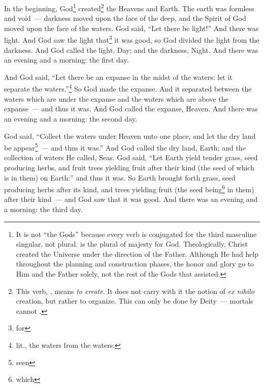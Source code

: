 
\begin{inparaenum}
     In the beginning, God\footnote{It is not ``the Gods'' because every verb is conjugated for the third masculine singular, not plural.  is the plural of majesty for God. Theologically, Christ created the Universe under the direction of the Father. Although He had help throughout the planning and construction phases, the honor and glory go to Him and the Father solely, not the rest of the Gods that assisted.} created\footnote{This verb, , means \textit{to create}. It does not carry with it the notion of \textit{ex nihilo} creation, but rather to organize. This can only be done by Deity~--- mortals cannot .} the Heavens and Earth.%
     The earth was formless and void~--- darkness moved upon the face of the deep, and the Spirit of God moved upon the face of the waters.%
     God said, ``Let there be light!'' And there was light.%
     And God saw the light that\footnote{for} it was good, so God divided the light from the darkness.%
     And God called the light, Day; and the darkness, Night. And there was an evening and a morning: the first day.%
    
     And God said, ``Let there be an expanse in the midst of the waters: let it separate the waters.''\footnote{lit., the waters from the waters.}%
     So God made the expanse. And it separated between the waters which are under the expanse and the waters which are above the expanse~--- and thus it was.%
     And God called the expanse, Heaven. And there was an evening and a morning: the second day.%
    
     God said, ``Collect the waters under Heaven unto one place, and let the dry land be appear\footnote{seen}~--- and thus it was.''%
     And God called the dry land, Earth; and the collection of waters He called, Seas.%
     God said, ``Let Earth yield tender grass, seed producing herbs, and fruit trees yielding fruit after their kind (the seed of which is in them) on Earth:'' and thus it was.%
     So Earth brought forth grass, seed producing herbs after its kind, and trees yielding fruit (the seed being\footnote{which} in them) after their kind~--- and God saw that it was good.%
     And there was an evening and a morning: the third day.%
    

\end{inparaenum}

